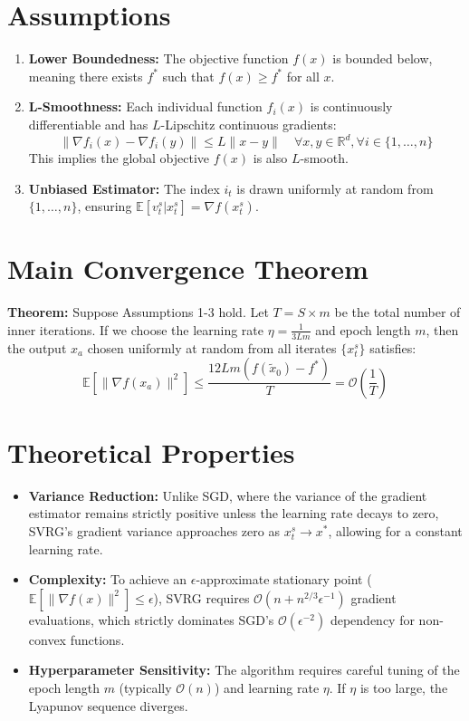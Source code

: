 \documentclass[11pt]{article}
\begin{document}
\section*{Assumptions}
\begin{enumerate}
    \item \textbf{Lower Boundedness:} The objective function $f(x)$ is bounded below, meaning there exists $f^*$ such that $f(x) \ge f^*$ for all $x$.
    \item \textbf{L-Smoothness:} Each individual function $f_i(x)$ is continuously differentiable and has $L$-Lipschitz continuous gradients:
    \begin{equation}
        \|\nabla f_i(x) - \nabla f_i(y)\| \le L \|x - y\| \quad \forall x, y \in \mathbb{R}^d, \forall i \in \{1, \dots, n\}
    \end{equation}
    This implies the global objective $f(x)$ is also $L$-smooth.
    \item \textbf{Unbiased Estimator:} The index $i_t$ is drawn uniformly at random from $\{1, \dots, n\}$, ensuring $\mathbb{E}[v_t^s | x_t^s] = \nabla f(x_t^s)$.
\end{enumerate}

\section*{Main Convergence Theorem}
\textbf{Theorem:} Suppose Assumptions 1-3 hold. Let $T = S \times m$ be the total number of inner iterations. If we choose the learning rate $\eta = \frac{1}{3Lm}$ and epoch length $m$, then the output $x_a$ chosen uniformly at random from all iterates $\{x_t^s\}$ satisfies:
\begin{equation}
    \mathbb{E}[\|\nabla f(x_a)\|^2] \le \frac{12Lm(f(\tilde{x}_0) - f^*)}{T} = \mathcal{O}\left(\frac{1}{T}\right)
\end{equation}

\section*{Theoretical Properties}
\begin{itemize}
    \item \textbf{Variance Reduction:} Unlike SGD, where the variance of the gradient estimator remains strictly positive unless the learning rate decays to zero, SVRG's gradient variance approaches zero as $x_t^s \to x^*$, allowing for a constant learning rate.
    \item \textbf{Complexity:} To achieve an $\epsilon$-approximate stationary point ($\mathbb{E}[\|\nabla f(x)\|^2] \le \epsilon$), SVRG requires $\mathcal{O}(n + n^{2/3}\epsilon^{-1})$ gradient evaluations, which strictly dominates SGD's $\mathcal{O}(\epsilon^{-2})$ dependency for non-convex functions.
    \item \textbf{Hyperparameter Sensitivity:} The algorithm requires careful tuning of the epoch length $m$ (typically $\mathcal{O}(n)$) and learning rate $\eta$. If $\eta$ is too large, the Lyapunov sequence diverges.
\end{itemize}
\end{document}
